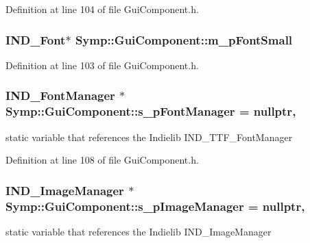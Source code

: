 Definition at line 104 of file Gui\-Component.\-h.

\hypertarget{class_symp_1_1_gui_component_a9704a149c8207503b3a7824b096b7b9f}{
\subsubsection[{m\-\_\-p\-Font\-Small}]{\setlength{\rightskip}{0pt plus 5cm}I\-N\-D\-\_\-\-Font$\ast$ Symp\-::\-Gui\-Component\-::m\-\_\-p\-Font\-Small\hspace{0.3cm}{\ttfamily [protected]}}}\label{class_symp_1_1_gui_component_a9704a149c8207503b3a7824b096b7b9f}


Definition at line 103 of file Gui\-Component.\-h.

\hypertarget{class_symp_1_1_gui_component_a4c817ae1da9423d19b7d7455c29c614a}{
\subsubsection[{s\-\_\-p\-Font\-Manager}]{\setlength{\rightskip}{0pt plus 5cm}I\-N\-D\-\_\-\-Font\-Manager $\ast$ Symp\-::\-Gui\-Component\-::s\-\_\-p\-Font\-Manager = nullptr\hspace{0.3cm}{\ttfamily [static]}, {\ttfamily [protected]}}}\label{class_symp_1_1_gui_component_a4c817ae1da9423d19b7d7455c29c614a}
static variable that references the Indielib I\-N\-D\-\_\-\-T\-T\-F\-\_\-\-Font\-Manager 

Definition at line 108 of file Gui\-Component.\-h.

\hypertarget{class_symp_1_1_gui_component_a7e1826a68cccf9b7a922e5f4176dba97}{
\subsubsection[{s\-\_\-p\-Image\-Manager}]{\setlength{\rightskip}{0pt plus 5cm}I\-N\-D\-\_\-\-Image\-Manager $\ast$ Symp\-::\-Gui\-Component\-::s\-\_\-p\-Image\-Manager = nullptr\hspace{0.3cm}{\ttfamily [static]}, {\ttfamily [protected]}}}\label{class_symp_1_1_gui_component_a7e1826a68cccf9b7a922e5f4176dba97}
static variable that references the Indielib I\-N\-D\-\_\-\-Image\-Manager 

